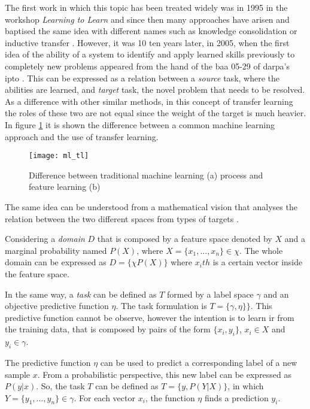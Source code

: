 	The first work in which this topic has been treated widely was in 1995 in the workshop \textit{Learning to Learn} \cite{Sarkar2018} and since then many approaches have arisen and baptised the same idea with different names such as knowledge consolidation or inductive transfer . However, it was 10 ten years later, in 2005, when the first idea of the ability of a system to identify and apply learned skills previously to completely new problems appeared from the hand of the \acrfull{baa} 05-29 of \acrfull{darpa}’s \acrfull{ipto} \cite{Pan2010}. This can be expressed as a relation between a \textit{source} task, where the abilities are learned, and \textit{target} task, the novel problem that needs to be resolved. As a difference with other similar methods, in this concept of transfer learning the roles of these two are not equal since the weight of the target is much heavier. In figure \ref{fig:mesh4} it is shown the difference between a common machine learning approach and the use of transfer learning.
	
	\begin{figure}[h]
		\centering
		\captionsetup{justification=centering}
		\texttt{[image: ml\_tl]}
		\caption{Difference between traditional machine learning (a) process and feature learning (b) \cite{Pan2010}}
		\label{fig:mesh4}
	\end{figure}
	
	The same idea can be understood from a mathematical vision that analyses the relation between the two different spaces from types of targets \cite{Pan2010}. 
	
	Considering a \textit{domain} $D$ that is composed by a feature space denoted by $X$ and a marginal probability named $P(X)$, where $X = \{x_1,..., x_n\} \in \chi$. The whole domain can be expressed as $D = \{\chi P(X)\}$ where $x_ith$ is a certain vector inside the feature space.
	
	In the same way, a \textit{task} can be defined as $T$ formed by a label space $\gamma$ and an objective predictive function $\eta$. The task formulation is $T = \{\gamma, \eta\}\}$. This predictive function cannot be observe, however the intention is to learn ir from the training data, that is composed by pairs of the form $\{x_i, y_i\}$, $x_i \in X$ and $y_i \in \gamma$.
	
	The predictive function $\eta$ can be used to predict a corresponding label of a new sample $x$. From a probabilistic perspective, this new label can be expressed as $P(y|x)$. So, the task $T$ can be defined as $T = \{y, P(Y|X)\}$, in which $Y = \{y_1,..., y_n\} \in \gamma$. For each vector $x_i$, the function $\eta$ finds a prediction $y_i$.
	

